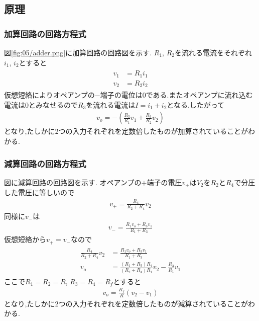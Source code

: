 \subsection{原理}
\subsubsection{加算回路の回路方程式}
図\ref{fig:05/adder.png}に加算回路の回路図を示す.
$R_1$, $R_2$を流れる電流をそれぞれ$i_1$, $i_2$とすると
\begin{align}
  \begin{split}
    v_1&=R_1i_1\\
    v_2&=R_2i_2
  \end{split}
\end{align}
仮想短絡によりオペアンプの$-$端子の電位は0である.またオペアンプに流れ込む電流は0とみなせるので$R_3$を流れる電流は$I=i_1+i_2$となる.したがって
\begin{align}
  \label{equ:adder}
  v_o=-\left(\frac{R_3}{R_1}v_1+\frac{R_3}{R_2}v_2\right)
\end{align}
となり,たしかに2つの入力それぞれを定数倍したものが加算されていることがわかる.
\subsubsection{減算回路の回路方程式}
図に減算回路の回路図を示す.
オペアンプの$+$端子の電圧$v_+$は$V_2$を$R_2$と$R_4$で分圧した電圧に等しいので
\begin{align}
  v_+=\frac{R_4}{R_2+R_4}v_2
\end{align}
同様に$v_-$は
\begin{align}
  v_-=\frac{R_1v_o+R_3v_1}{R_1+R_3}
\end{align}
仮想短絡から$v_+=v_-$なので
\begin{align}
  \begin{split}
    \label{equ:subtractor}
    \frac{R_4}{R_2+R_4}v_2&=\frac{R_1v_o+R_3v_1}{R_1+R_3}\\
    v_o&=\frac{(R_1+R_3)R_4}{(R_2+R_4)R_1}v_2-\frac{R_3}{R_1}v_1
  \end{split}
\end{align}
ここで$R_1=R_2=R$, $R_3=R_4=R_f$とすると
\begin{align}
  v_o=\frac{R_f}{R}(v_2-v_1)
\end{align}
となり,たしかに2つの入力それぞれを定数倍したものが減算されていることがわかる.
